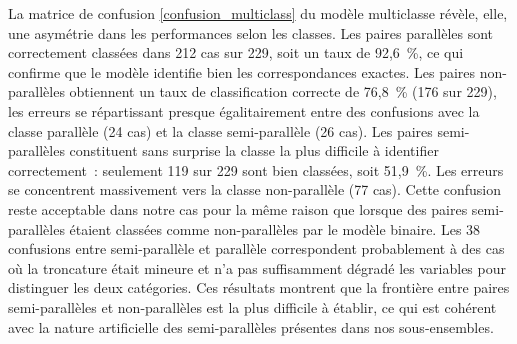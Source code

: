 La matrice de confusion \ref{confusion_multiclass} du modèle multiclasse révèle, elle,
une asymétrie dans les performances selon les
classes. Les paires parallèles sont correctement classées dans 212 cas sur 229, soit un taux de 92,6~\%,
ce qui confirme que le modèle identifie bien les correspondances exactes. Les paires non-parallèles
obtiennent un taux de classification correcte de 76,8~\% (176 sur 229), les erreurs se répartissant presque égalitairement
entre des confusions avec la classe parallèle (24 cas) et la classe semi-parallèle
(26 cas). Les paires semi-parallèles constituent sans surprise la classe la plus difficile à identifier
correctement~: seulement 119 sur 229 sont bien classées, soit 51,9~\%. Les erreurs se concentrent massivement
vers la classe non-parallèle (77 cas). Cette confusion reste acceptable dans notre cas pour la même raison que lorsque
des paires semi-parallèles étaient classées comme non-parallèles par le modèle binaire. Les 38 confusions entre
semi-parallèle et parallèle correspondent probablement à des cas où la troncature était mineure et n'a
pas suffisamment dégradé les variables pour distinguer les deux catégories. Ces résultats montrent que la
frontière entre paires semi-parallèles et non-parallèles est la plus difficile à établir, ce qui est cohérent
avec la nature artificielle des semi-parallèles présentes dans nos sous-ensembles.

